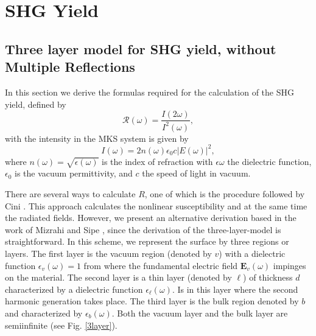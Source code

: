 \documentclass[10pt]{book}
\begin{document}
\tableofcontents

\chapter{SHG Yield}

\section{Three layer model for SHG yield, without Multiple Reflections}

In this section we derive the formulas required for the calculation of the SHG
yield, defined by
\begin{equation}\label{uno}
\mathcal{R}(\omega)=\frac{I(2\omega)}{I^2(\omega)}
,
\end{equation}
with the intensity in the MKS system is given by\cite{boyd}
\begin{equation}\label{dos}
I(\omega)=2n(\omega)\epsilon_{0}c
|E(\omega)|^2
,
\end{equation}
where $n(\omega)=\sqrt{\epsilon(\omega)}$ is the index of refraction with
$\epsilon\omega$ the dielectric function, $\epsilon_{0}$ is the vacuum permittivity,
and $c$ the speed of light in vacuum.

There are several ways to calculate $R$, one of which is the procedure followed
by Cini \cite{ciniPRB91}. This approach calculates the nonlinear susceptibility
and at the same time the radiated fields. However, we present an alternative
derivation based in the work of Mizrahi and Sipe \cite{mizrahiJOSA88}, since the
derivation of the three-layer-model is straightforward. In this scheme, we
represent the surface by three regions or layers. The first layer is the vacuum
region (denoted by $v$) with a dielectric function $\epsilon_v(\omega)=1$ from
where the fundamental electric field $\mathbf{E}_v(\omega)$ impinges on the
material. The second  layer is a thin layer (denoted by $\ell$) of thickness $d$
characterized by a dielectric function $\epsilon_\ell(\omega)$. Is in this layer
where the second harmonic generation takes place. The third layer is the bulk
region denoted by $b$ and characterized by $\epsilon_b(\omega)$. Both the vacuum
layer and the bulk layer are semiinfinite  (see Fig. \ref{3layer}).
\end{document}
